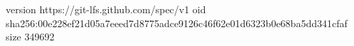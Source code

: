 version https://git-lfs.github.com/spec/v1
oid sha256:00e228ef21d05a7eeed7d8775adce9126c46f62e01d6323b0e68ba5dd341cfaf
size 349692
